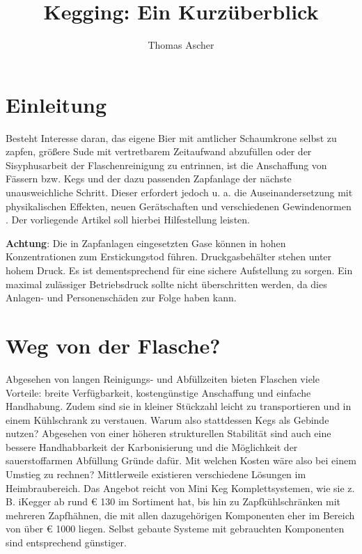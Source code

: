 \documentclass[a4paper,parskip=half]{scrartcl}
\title{Kegging: Ein Kurzüberblick}
\author{Thomas Ascher}
\begin{document}
\maketitle

\section*{Einleitung}

Besteht Interesse daran, das eigene Bier mit amtlicher Schaumkrone selbst zu zapfen, größere Sude mit vertretbarem Zeitaufwand abzufüllen oder der Sisyphusarbeit der Flaschenreinigung zu entrinnen, ist die Anschaffung von Fässern bzw. Kegs und der dazu passenden Zapfanlage der nächste unausweichliche Schritt. Dieser erfordert jedoch u. a. die Auseinandersetzung mit physikalischen Effekten, neuen Gerätschaften und verschiedenen Gewindenormen \autocite{GastroBrennecke2021}. Der vorliegende Artikel soll hierbei Hilfestellung leisten.

\textbf{Achtung}: Die in Zapfanlagen eingesetzten Gase können in hohen Konzentrationen zum Erstickungstod führen. Druckgasbehälter stehen unter hohem Druck. Es ist dementsprechend für eine sichere Aufstellung zu sorgen. Ein maximal zulässiger Betriebsdruck sollte nicht überschritten werden, da dies Anlagen- und Personenschäden zur Folge haben kann.

\section*{Weg von der Flasche?}

Abgesehen von langen Reinigungs- und Abfüllzeiten bieten Flaschen viele Vorteile: breite Verfügbarkeit, kostengünstige Anschaffung und einfache Handhabung. Zudem sind sie in kleiner Stückzahl leicht zu transportieren und in einem Kühlschrank zu verstauen. Warum also stattdessen Kegs als Gebinde nutzen? Abgesehen von einer höheren strukturellen Stabilität sind auch eine bessere Handhabbarkeit der Karbonisierung und die Möglichkeit der sauerstoffarmen Abfüllung Gründe dafür. Mit welchen Kosten wäre also bei einem Umstieg zu
rechnen? Mittlerweile existieren verschiedene Lösungen im Heimbraubereich. Das
Angebot reicht von Mini Keg Komplettsystemen, wie sie z. B. iKegger ab rund
€ 130 im Sortiment hat, bis hin zu Zapfkühlschränken mit mehreren Zapfhähnen,
die mit allen dazugehörigen Komponenten eher im Bereich von über € 1000 liegen.
Selbst gebaute Systeme mit gebrauchten Komponenten sind entsprechend günstiger.
\end{document}
